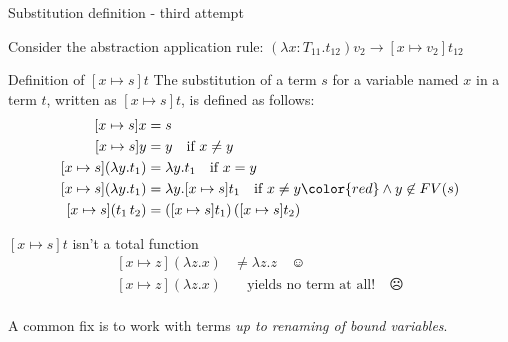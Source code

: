 \documentclass[8pt]{beamer}
\begin{document}
\begin{frame}{Substitution definition - third attempt}

    Consider the abstraction application rule:
        $(\lambda x:T_{11}.t_{12})v_{2} \rightarrow [x \mapsto v_{2}]t_{12}$

    \pause

    \begin{block}{Definition of $[x \mapsto s]t$}
        The substitution of a term $s$ for a variable named $x$ in a term $t$,
        written as $[x \mapsto s]t$, is defined as follows:
        \begin{displaymath}
            \begin{split}
                [x \mapsto s]x &= s \\
                [x \mapsto s]y &= y \quad \text{if } x \not = y\\
                [x \mapsto s](\lambda y.t_{1}) &= \lambda y. t_{1} \quad 
                    \text{if } x = y\\
                [x \mapsto s](\lambda y.t_{1}) &= \lambda y. [x \mapsto s]t_{1} 
                                    \quad \text{if } x \not = y 
                                    {\color{red}\wedge y \not \in FV(s)}\\
                [x \mapsto s](t_{1} \, t_{2}) &= 
                    ([x \mapsto s]t_{1})\, ([x \mapsto s]t_{2})\\
            \end{split}
        \end{displaymath}        
    \end{block}

    \pause

    \begin{alertblock}{$[x \mapsto s]t$ isn't a total function}
        \begin{displaymath}
            \begin{split}
                [x \mapsto z](\lambda z.x) &\not = \lambda z.z \quad \smiley\\ 
                [x \mapsto z](\lambda z.x) &\quad \text{yields no term at all!} 
                    \quad \frownie\\
            \end{split}
        \end{displaymath}
    \end{alertblock}
    \pause
    A common fix is to work with terms \emph{up to renaming of bound variables}.
\end{frame}
\end{document}
